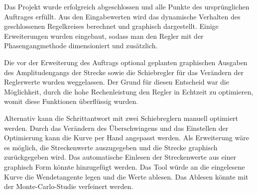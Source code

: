 Das   Projekt   wurde   erfolgreich   abgeschlossen  und   alle   Punkte   des
urspr\"unglichen   Auftrages  erf\"ullt. Aus   den   Eingabewerten  wird   das
dynamische Verhalten  des geschlossenen  Regelkreises berechnet  und graphisch
dargestellt. Einige Erweiterungen wurden eingebaut,  sodass man den Regler mit
der Phasengangmethode dimensioniert und zus\"atzlich.


Die vor der  Erweiterung des Auftrags optional  geplanten graphischen Ausgaben
des Amplitudengangs der  Strecke sowie die Schiebregler  f\"ur das Ver\"andern
der Reglerwerte wurden  weggelassen. Der Grund f\"ur diesen  Entscheid war die
M\"oglichkeit,  durch  die  hohe  Rechenleistung den  Regler  in  Echtzeit  zu
optimieren, womit diese Funktionen \"uberfl\"ussig wurden.


Alternativ kann  die Schrittantwort  mit zwei Schiebreglern  manuell optimiert
werden. Durch  das Ver\"andern  des  \"Uberschwingens und  das Einstellen  der
Optimierung kann die Kurve per  Hand angepasst werden.  Als Erweiterung w\"are
es  m\"oglich,  die  Streckenwerte  auszugegeben  und  die  Strecke  graphisch
zur\"uckgegeben wird. Das  automatische Einlesen  der Streckenwerte  aus einer
graphisch Form k\"onnte hinzugef\"ugt werden. Das Tool w\"urde an die eingelesene
Kurve die Wendetangente legen und  die Werte ablesen. Das Ablesen k\"onnte mit
der Monte-Carlo-Studie verfeinert werden.
